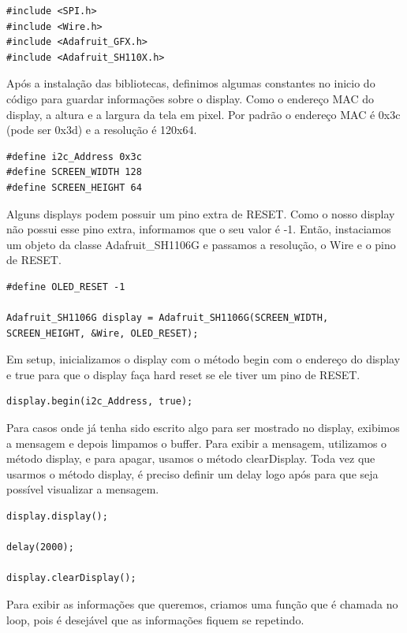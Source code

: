 \documentclass[12pt]{article}
\begin{document}
\begin{lstlisting}
#include <SPI.h>
#include <Wire.h>
#include <Adafruit_GFX.h>
#include <Adafruit_SH110X.h>
\end{lstlisting}

Após a instalação das bibliotecas, definimos algumas constantes no inicio do código para guardar informações sobre o display. Como o endereço MAC do display, a altura e a largura da tela em pixel. Por padrão o endereço MAC é 0x3c (pode ser 0x3d) e a resolução é 120x64. 

\begin{lstlisting}
#define i2c_Address 0x3c 
#define SCREEN_WIDTH 128 
#define SCREEN_HEIGHT 64 
\end{lstlisting}

Alguns displays podem possuir um pino extra de RESET. Como o nosso display não possui esse pino extra, informamos que o seu valor é -1. Então, instaciamos um objeto da classe Adafruit\_SH1106G e passamos a resolução, o Wire e o pino de RESET.

\begin{lstlisting}
#define OLED_RESET -1

Adafruit_SH1106G display = Adafruit_SH1106G(SCREEN_WIDTH, SCREEN_HEIGHT, &Wire, OLED_RESET);
\end{lstlisting}


Em setup, inicializamos o display com o método begin com o endereço do display e true para que o display faça hard reset se ele tiver um pino de RESET. 

\begin{lstlisting}
display.begin(i2c_Address, true);
\end{lstlisting}

Para casos onde já tenha sido escrito algo para ser mostrado no display, exibimos a mensagem e depois limpamos o buffer. Para exibir a mensagem, utilizamos o método display, e para apagar, usamos o método clearDisplay. Toda vez que usarmos o método display, é preciso definir um delay logo após para que seja possível visualizar a mensagem.

\begin{lstlisting}
display.display();

delay(2000);

display.clearDisplay();
\end{lstlisting}

Para exibir as informações que queremos, criamos uma função que é chamada no loop, pois é desejável que as informações fiquem se repetindo. 
\end{document}
